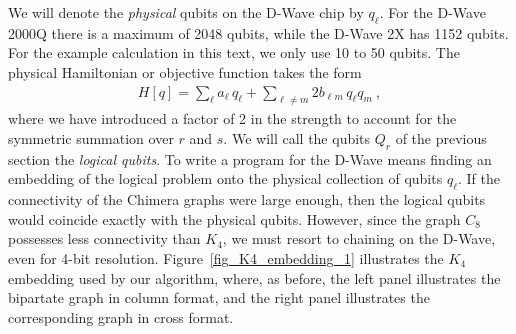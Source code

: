 \documentclass[preprint,12pt,eqsecnum,nofootinbib,amsmath,amssymb]{revtex4}
\begin{document}
We will denote the {\em physical} qubits on the D-Wave chip by $q_\ell$. For 
the D-Wave 2000Q there is a maximum of 2048 qubits, while the D-Wave 2X 
has 1152 qubits. For the example calculation in this text, we only use 10 to 
50 qubits. The physical Hamiltonian or objective function takes the form
%
\begin{eqnarray}
  H[q] = \sum_\ell a_\ell \, q_\ell + \sum_{\ell \ne m} 2 b_{\ell m} \, q_\ell q_m
  \ ,
\end{eqnarray}
%
where we have introduced a factor of 2 in the strength  to account for the 
symmetric summation over $r$ and $s$. We will call the qubits $Q_r$
of the previous section the {\em logical  qubits}. To write a program for the
D-Wave means finding an embedding of the logical problem onto
the physical collection of qubits $q_\ell$. If the connectivity of the Chimera 
graphs were large enough, then the logical qubits would coincide exactly with 
the physical qubits. However, since the graph $C_8$ possesses less connectivity 
than $K_4$,  we must resort to chaining on the D-Wave, even for
4-bit resolution. Figure~\ref{fig_K4_embedding_1} illustrates the $K_4$ embedding 
used by our algorithm, where, as before, the left panel illustrates the bipartate 
graph in column format, and the right panel illustrates the corresponding graph 
in cross format. 
%
\end{document}
